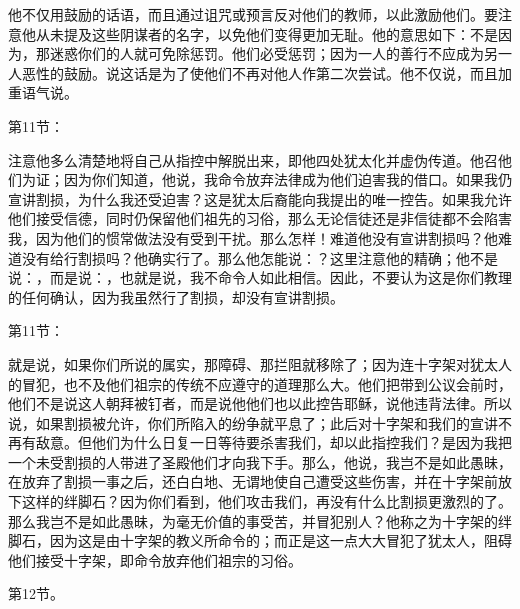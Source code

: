 他不仅用鼓励的话语，而且通过诅咒或预言反对他们的教师，以此激励他们。要注意他从未提及这些阴谋者的名字，以免他们变得更加无耻。他的意思如下：不是因为，那迷惑你们的人就可免除惩罚。他们必受惩罚；因为一人的善行不应成为另一人恶性的鼓励。说这话是为了使他们不再对他人作第二次尝试。他不仅说，而且加重语气说。\par

第11节：\par

注意他多么清楚地将自己从指控中解脱出来，即他四处犹太化并虚伪传道。他召他们为证；因为你们知道，他说，我命令放弃法律成为他们迫害我的借口。如果我仍宣讲割损，为什么我还受迫害？这是犹太后裔能向我提出的唯一控告。如果我允许他们接受信德，同时仍保留他们祖先的习俗，那么无论信徒还是非信徒都不会陷害我，因为他们的惯常做法没有受到干扰。那么怎样！难道他没有宣讲割损吗？他难道没有给行割损吗？他确实行了。那么他怎能说：？这里注意他的精确；他不是说：，而是说：，也就是说，我不命令人如此相信。因此，不要认为这是你们教理的任何确认，因为我虽然行了割损，却没有宣讲割损。\par

第11节：\par

就是说，如果你们所说的属实，那障碍、那拦阻就移除了；因为连十字架对犹太人的冒犯，也不及他们祖宗的传统不应遵守的道理那么大。他们把带到公议会前时，他们不是说这人朝拜被钉者，而是说他他们也以此控告耶稣，说他违背法律。所以说，如果割损被允许，你们所陷入的纷争就平息了；此后对十字架和我们的宣讲不再有敌意。但他们为什么日复一日等待要杀害我们，却以此指控我们？是因为我把一个未受割损的人带进了圣殿他们才向我下手。那么，他说，我岂不是如此愚昧，在放弃了割损一事之后，还白白地、无谓地使自己遭受这些伤害，并在十字架前放下这样的绊脚石？因为你们看到，他们攻击我们，再没有什么比割损更激烈的了。那么我岂不是如此愚昧，为毫无价值的事受苦，并冒犯别人？他称之为十字架的绊脚石，因为这是由十字架的教义所命令的；而正是这一点大大冒犯了犹太人，阻碍他们接受十字架，即命令放弃他们祖宗的习俗。\par

第12节。\par

